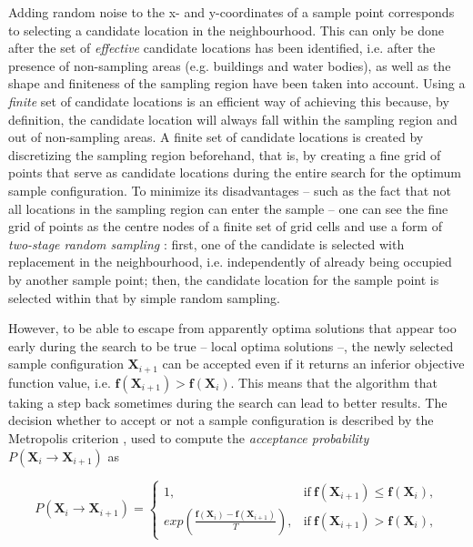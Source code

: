 Adding random noise to the x- and y-coordinates of a sample point corresponds to selecting a candidate location 
in the neighbourhood. This can only be done after the set of \emph{effective} candidate locations has been 
identified, i.e. after the presence of non-sampling areas (e.g. buildings and water bodies), as well as the 
shape and finiteness of the sampling region have been taken into account. Using a \emph{finite} set of 
candidate locations is an efficient way of achieving this because, by definition, the candidate location will 
always fall within the sampling region and out of non-sampling areas. A finite set of candidate locations is 
created by discretizing the sampling region beforehand, that is, by creating a fine grid of points that serve 
as candidate locations during the entire search for the optimum sample configuration. To minimize its 
disadvantages -- such as the fact that not all locations in the sampling region can enter the sample -- one can 
see the fine grid of points as the centre nodes of a finite set of grid cells and use a form of \emph{two-stage 
random sampling} \cite{WalvoortEtAl2010}: first, one of the candidate  is selected with 
replacement in the neighbourhood, i.e. independently of already being occupied by another sample point; then, 
the candidate location for the sample point is selected within that  by simple random sampling.

However, to be able to escape from apparently optima solutions that appear too early during the search to be 
true -- local optima solutions --, the newly selected sample configuration $\boldsymbol{X}_{i + 1}$ can be 
accepted even if it returns an inferior objective function value, i.e. $\boldsymbol{f}(\boldsymbol{X}_{i + 1}) 
>  \boldsymbol{f}(\boldsymbol{X}_i)$. This means that the algorithm  that taking a step back 
sometimes during the search can lead to better results. The decision whether to accept or not a sample 
configuration is described by the Metropolis criterion \cite{MetropolisEtAl1953}, used to compute the 
\emph{acceptance probability} $P(\boldsymbol{X}_i \rightarrow \boldsymbol{X}_{i + 1})$ as

\begin{equation}\label{eqn:chap08-metropolis} %
 P(\boldsymbol{X}_i \rightarrow \boldsymbol{X}_{i + 1}) = 
 \begin{cases}
  1, & \text{if}\  \boldsymbol{f}(\boldsymbol{X}_{i + 1}) \leq  \boldsymbol{f}(\boldsymbol{X}_i), \\ 
  exp\left(\frac{\boldsymbol{f}(\boldsymbol{X}_i) -  \boldsymbol{f}(\boldsymbol{X}_{i + 1})}{T}\right),  
      & \text{if}\  \boldsymbol{f}(\boldsymbol{X}_{i + 1}) >  \boldsymbol{f}(\boldsymbol{X}_i ),
 \end{cases}
\end{equation}

